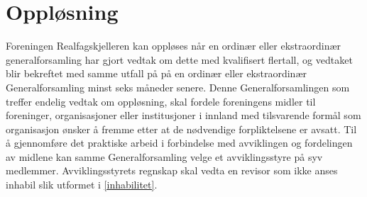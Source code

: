 \section{Oppløsning} \label{oppløsning}

Foreningen Realfagskjelleren kan oppløses når en ordinær eller ekstraordinær generalforsamling har gjort vedtak om dette med kvalifisert flertall, og vedtaket blir bekreftet med samme utfall på på en ordinær eller ekstraordinær Generalforsamling minst seks måneder senere.
Denne Generalforsamlingen som treffer endelig vedtak om oppløsning, skal fordele foreningens midler til foreninger, organisasjoner eller institusjoner i innland med tilsvarende formål som organisasjon ønsker å fremme etter at de nødvendige forpliktelsene er avsatt.
Til å gjennomføre det praktiske arbeid i forbindelse med avviklingen og fordelingen av midlene kan samme Generalforsamling velge et avviklingsstyre på syv medlemmer.
Avviklingsstyrets regnskap skal vedta en revisor som ikke anses inhabil slik utformet i \ref{inhabilitet}.
